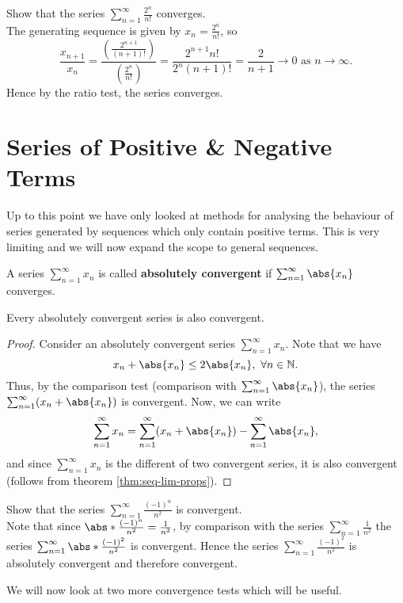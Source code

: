 \documentclass[../real_analysis.tex]{subfiles}
\begin{document}
            \begin{example}
                Show that the series $\sum_{n=1}^\infty\frac{2^n}{n!}$ converges.\\
                The generating sequence is given by $x_n=\frac{2^n}{n!}$, so
                \begin{equation}
                    \frac{x_{n+1}}{x_n}=\frac{\left(\frac{2^{n+1}}{(n+1)!}\right)}{\left(\frac{2^n}{n!}\right)}=\frac{2^{n+1}n!}{2^n(n+1)!}=\frac{2}{n+1}\to0\text{ as }n\to\infty.
                \end{equation}
                Hence by the ratio test, the series converges.
            \end{example}

    \section{Series of Positive \& Negative Terms}\label{sec:series-of-positive-and-negative-terms}
        Up to this point we have only looked at methods for analysing the behaviour of series generated by sequences which only contain positive terms. This is very limiting and we will now expand the scope to general sequences.
        \begin{definition}
            A series $\sum_{n=1}^\infty x_n$ is called \textbf{absolutely convergent} if $\sum_{n=1}^\infty\abs{x_n}$ converges.
        \end{definition}
        \begin{theorem}
            Every absolutely convergent series is also convergent.
        \end{theorem}
        \begin{proof}
            Consider an absolutely convergent series $\sum_{n=1}^\infty x_n$. Note that we have
            \begin{equation}
                x_n+\abs{x_n}\leq2\abs{x_n},\ \forall n\in\mathbb{N}.
            \end{equation}
            Thus, by the comparison test (comparison with $\sum_{n=1}^\infty\abs{x_n}$), the series $\sum_{n=1}^\infty(x_n+\abs{x_n})$ is convergent. Now, we can write
            \begin{equation}
                \sum_{n=1}^\infty x_n=\sum_{n=1}^\infty(x_n+\abs{x_n})-\sum_{n=1}^\infty\abs{x_n},
            \end{equation}
            and since $\sum_{n=1}^\infty x_n$ is the different of two convergent series, it is also convergent (follows from theorem \ref{thm:seq-lim-props}).
        \end{proof}
        \begin{example}
            Show that the series $\sum_{n=1}^\infty\frac{(-1)^n}{n^2}$ is convergent.\\
            Note that since $\abs*{\frac{(-1)^n}{n^2}}=\frac{1}{n^2}$, by comparison with the series $\sum_{n=1}^\infty\frac{1}{n^2}$ the series $\sum_{n=1}^\infty\abs*{\frac{(-1)^2}{n^2}}$ is convergent. Hence the series $\sum_{n=1}^\infty\frac{(-1)^2}{n^2}$ is absolutely convergent and therefore convergent.
        \end{example}
        We will now look at two more convergence tests which will be useful.
\end{document}
